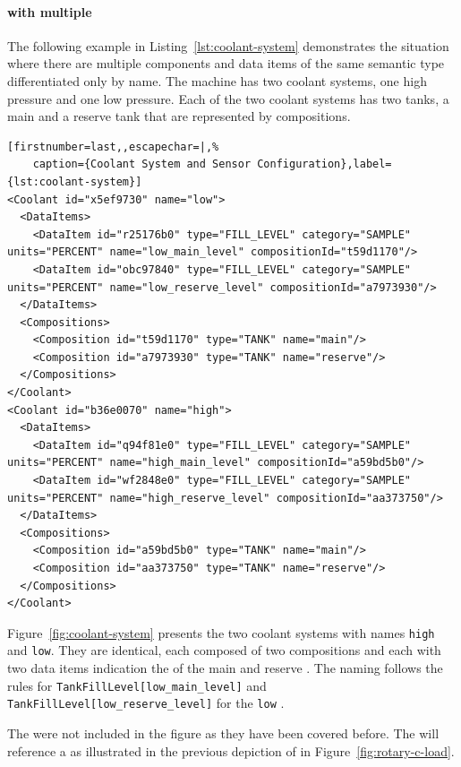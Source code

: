 \FloatBarrier

\paragraph{  with multiple }

The following example in Listing~\ref{lst:coolant-system} demonstrates the situation where there are multiple components and data items of the same semantic type differentiated only by name. The machine has two coolant systems, one high pressure and one low pressure. Each of the two coolant systems has two tanks, a main and a reserve tank that are represented by compositions. 

\begin{lstlisting}[firstnumber=last,,escapechar=|,%
    caption={Coolant System and Sensor Configuration},label={lst:coolant-system}]
<Coolant id="x5ef9730" name="low">
  <DataItems>
    <DataItem id="r25176b0" type="FILL_LEVEL" category="SAMPLE" units="PERCENT" name="low_main_level" compositionId="t59d1170"/>
    <DataItem id="obc97840" type="FILL_LEVEL" category="SAMPLE" units="PERCENT" name="low_reserve_level" compositionId="a7973930"/>
  </DataItems>
  <Compositions>
    <Composition id="t59d1170" type="TANK" name="main"/>
    <Composition id="a7973930" type="TANK" name="reserve"/>
  </Compositions>
</Coolant>
<Coolant id="b36e0070" name="high">
  <DataItems>
    <DataItem id="q94f81e0" type="FILL_LEVEL" category="SAMPLE" units="PERCENT" name="high_main_level" compositionId="a59bd5b0"/>
    <DataItem id="wf2848e0" type="FILL_LEVEL" category="SAMPLE" units="PERCENT" name="high_reserve_level" compositionId="aa373750"/>
  </DataItems>
  <Compositions>
    <Composition id="a59bd5b0" type="TANK" name="main"/>
    <Composition id="aa373750" type="TANK" name="reserve"/>
  </Compositions>
</Coolant>
\end{lstlisting}

Figure~\ref{fig:coolant-system} presents the two coolant systems with names \texttt{high} and \texttt{low}. They are identical, each composed of two  compositions and each with two data items indication the  of the main and reserve . The naming follows the rules for \texttt{TankFillLevel[low_main_level]} and \texttt{TankFillLevel[low_reserve_level]} for the \texttt{low} . 

The  were not included in the figure as they have been covered before. The   will reference a    as illustrated in the previous depiction of  in Figure~\ref{fig:rotary-c-load}.

